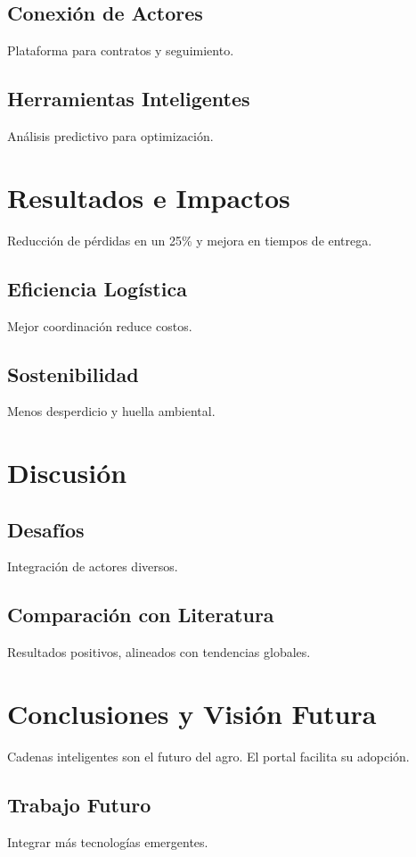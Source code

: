 \subsection{Conexión de Actores}
Plataforma para contratos y seguimiento.

\subsection{Herramientas Inteligentes}
Análisis predictivo para optimización.

\section{Resultados e Impactos}

Reducción de pérdidas en un 25\% y mejora en tiempos de entrega.

\subsection{Eficiencia Logística}
Mejor coordinación reduce costos.

\subsection{Sostenibilidad}
Menos desperdicio y huella ambiental.

\section{Discusión}

\subsection{Desafíos}
Integración de actores diversos.

\subsection{Comparación con Literatura}
Resultados positivos, alineados con tendencias globales.

\section{Conclusiones y Visión Futura}

Cadenas inteligentes son el futuro del agro. El portal facilita su adopción.

\subsection{Trabajo Futuro}
Integrar más tecnologías emergentes.

